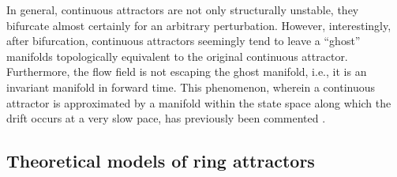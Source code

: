 \documentclass{article} %
\newcounter{ct}
\theoremstyle{definition}
\theoremstyle{remark}
\renewcommand{\cite}{\citep}
\begin{document}

In general, continuous attractors are not only structurally unstable, they bifurcate almost certainly for an arbitrary perturbation.
However, interestingly, after bifurcation, continuous attractors seemingly tend to leave a ``ghost'' manifolds topologically equivalent to the original continuous attractor.
Furthermore, the flow field is not escaping the ghost manifold, i.e., it is an invariant manifold in forward time.
This phenomenon, wherein a continuous attractor is approximated by a manifold within the state space along which the drift occurs at a very slow pace, has previously been commented \citep{seung1997learning,Mante2013-em}.

%

\subsection{Theoretical models of ring attractors}\label{sec:ras}
\end{document}

